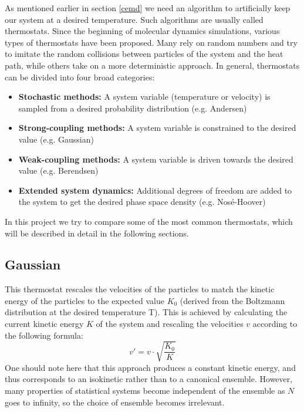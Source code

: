 As mentioned earlier in section \ref{cemd} we need an algorithm to artificially keep our system at a desired temperature. Such algorithms are usually called thermostats. Since the beginning of molecular dynamics simulations, various types of thermostats have been proposed. Many rely on random numbers and try to imitate the random collisions between particles of the system and the heat path, while others take on a more deterministic approach. In general, thermostats can be divided into four broad categories: 
\begin{itemize}
\item \textbf{Stochastic methods:} A system variable (temperature or velocity) is sampled from a desired probability distribution (e.g. Andersen)
\item \textbf{Strong-coupling methods:} A system variable is constrained to the desired value (e.g. Gaussian) 
\item \textbf{Weak-coupling methods:} A system variable is driven towards the desired value (e.g. Berendsen) 
\item \textbf{Extended system dynamics:} Additional degrees of freedom are added to the system to get the desired phase space density (e.g. Nosé-Hoover) 
\end{itemize}  
In this project we try to compare some of the most common thermostats, which will be described in detail in the following sections. 

\subsection{Gaussian}\label{th:gaussian}
This thermostat rescales the velocities of the particles to match the kinetic energy of the particles to the expected value $K_0$ (derived from the Boltzmann distribution at the desired temperature T). This is achieved by calculating the current kinetic energy $K$ of the system and rescaling the velocities $v$ according to the following formula:
\begin{equation}
v'  = v\cdot \sqrt{\frac{K_0}{K}}\label{eq:gauss}
\end{equation}
One should note here that this approach produces a constant kinetic energy, and thus corresponds to an isokinetic rather than to a canonical ensemble. However, many properties of statistical systems become independent of the ensemble as $N$ goes to infinity, so the choice of ensemble becomes irrelevant.  

